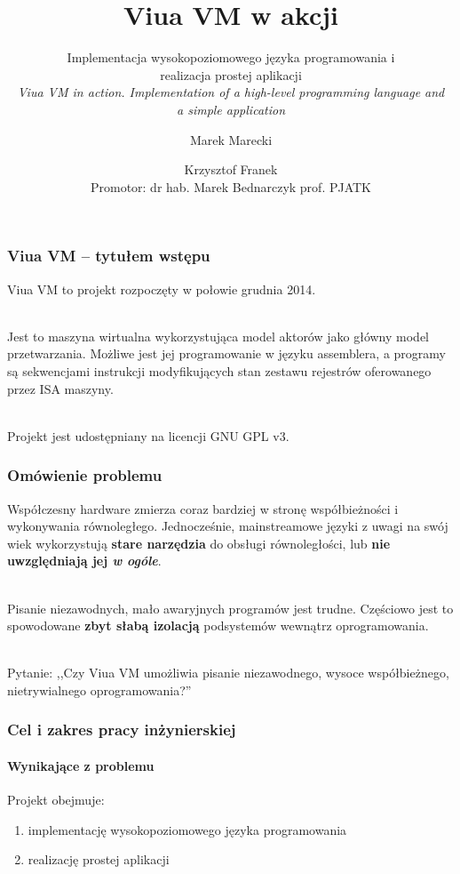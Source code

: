 \documentclass[aspectratio=169]{beamer}
\title{Viua VM w akcji}
\subtitle{Implementacja wysokopoziomowego języka programowania i\\realizacja prostej aplikacji
\\
\emph{Viua VM in action. Implementation of a high-level programming language and\\a simple application}}
\author{Marek Marecki \and Krzysztof Franek \\ Promotor: dr hab. Marek Bednarczyk prof. PJATK}
\begin{document}

\frame{\titlepage}

\begin{frame}
    \frametitle{Viua VM -- tytułem wstępu}

    Viua VM to projekt rozpoczęty w połowie grudnia 2014.

    ~\\

    Jest to maszyna wirtualna wykorzystująca model aktorów jako główny model przetwarzania.
    Możliwe jest jej programowanie w języku assemblera, a programy są sekwencjami instrukcji modyfikujących
    stan zestawu rejestrów oferowanego przez ISA maszyny.

    ~\\

    Projekt jest udostępniany na licencji GNU GPL v3.
\end{frame}

\begin{frame}
    \frametitle{Omówienie problemu}

    Współczesny hardware zmierza coraz bardziej w stronę współbieżności i
    wykonywania równoległego. Jednocześnie, mainstreamowe języki z uwagi na swój
    wiek wykorzystują \textbf{stare narzędzia} do obsługi równoległości, lub
    \textbf{nie uwzględniają jej \emph{w ogóle}}.

    ~\\

    Pisanie niezawodnych, mało awaryjnych programów jest trudne. Częściowo jest
    to spowodowane \textbf{zbyt słabą izolacją} podsystemów wewnątrz oprogramowania.

    ~\\

    Pytanie: ,,Czy Viua VM umożliwia pisanie niezawodnego, wysoce współbieżnego,
    nietrywialnego oprogramowania?''
\end{frame}

\begin{frame}
    \frametitle{Cel i zakres pracy inżynierskiej}
    \framesubtitle{Wynikające z problemu}

    Projekt obejmuje:
    \begin{enumerate}
        \item implementację wysokopoziomowego języka programowania
        \item realizację prostej aplikacji
    \end{enumerate}
\end{frame}
\end{document}
